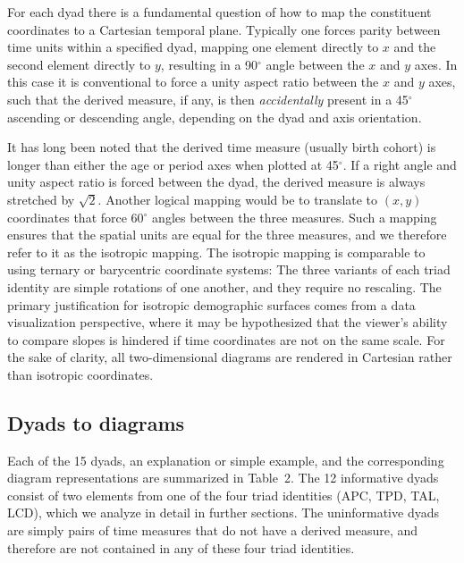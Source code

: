 \documentclass{bmcart}
\theoremstyle{definition}
\begin{document}
For each dyad there is a fundamental question of how to map the constituent
coordinates to a Cartesian temporal plane. Typically one forces parity between time units within
a specified dyad, mapping one element directly to $x$ and the second element
directly to $y$, resulting in a 90$^\circ$ angle between the $x$ and $y$
axes. In this case it is conventional to force a unity aspect ratio
between the $x$ and $y$ axes, such that the derived measure, if any, is then
\textit{accidentally} present in a 45$^\circ$ ascending or descending angle,
depending on the dyad and axis orientation. 

It has long been noted \citep{lexis1875einleitung, perozzo1880della} that the
derived time measure (usually birth cohort) is longer than either the age or period axes when plotted at 45$^\circ$.
If a right angle and unity aspect ratio is forced between the dyad, the derived measure is always stretched by
$\sqrt{2}$. Another
logical mapping would be to translate to $(x,y)$ coordinates that force 60$^\circ$
angles between the three measures. Such a mapping ensures that the spatial units are equal for the three measures, and we therefore refer to it as the isotropic mapping. The isotropic mapping
is comparable to using ternary or barycentric coordinate systems: The three variants of each
 triad identity are simple rotations of one another, and they require no
 rescaling. The primary justification for isotropic demographic surfaces comes from
a data visualization perspective, where it may be hypothesized that the
 viewer's ability to compare slopes is hindered if time coordinates are not on
 the same scale. For the sake of clarity, all two-dimensional diagrams are rendered in
 Cartesian rather than isotropic coordinates.

\subsection{Dyads to diagrams}
Each of the 15 dyads, an explanation or simple example,
and the corresponding diagram representations are summarized in
Table~2. The 12 informative dyads consist of two
elements from one of the four triad identities (APC, TPD, TAL, LCD), which we
analyze in detail in further sections. The uninformative dyads are simply pairs
of time measures that do not have a derived measure, and therefore are not
contained in any of these four triad identities.
\end{document}
